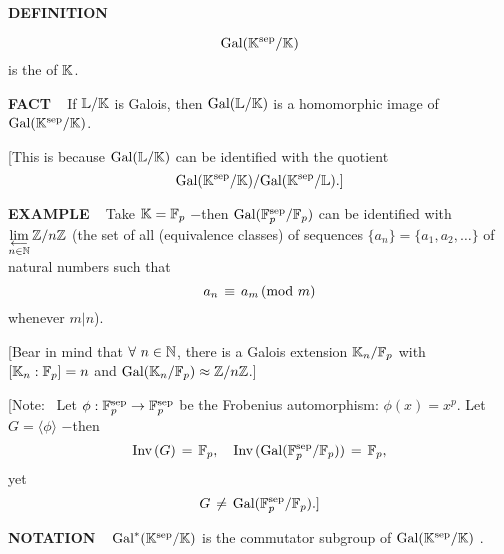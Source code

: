 \begin{x}{\small\bf DEFINITION} \ %

\[
\text{Gal}(\mathbb{K}^{\text{sep}}/\mathbb{K})
\]
is the 
of $\mathbb{K}$.
\end{x}

\vspace{0.1cm}

\begin{x}{\small\bf FACT} \ %
If \hsx $\mathbb{L}/\mathbb{K}$ is Galois, then $\text{Gal}(\mathbb{L}/\mathbb{K})$ is a homomorphic image of $\text{Gal}(\mathbb{K}^{\text{sep}}/\mathbb{K})$.

\vspace{0.1cm}

[This is because $\text{Gal}(\mathbb{L}/\mathbb{K})$ can be identified with the quotient
\[
\text{Gal}(\mathbb{K}^{\text{sep}}/\mathbb{K}) / \text{Gal}(\mathbb{K}^{\text{sep}}/\mathbb{L}).]
\]
\end{x}

\vspace{0.1cm}

\begin{x}{\small\bf EXAMPLE} \ %
Take $\mathbb{K} = \mathbb{F}_p$ $-$then $\text{Gal}(\mathbb{F}_p^{\text{sep}} /\mathbb{F}_p)$ can be identified with \ 
$\lim\limits_{\substack{\longleftarrow\\ n \in \mathbb{N}}} \mathbb{Z}/n\mathbb{Z}$ 
(the set of all (equivalence classes) of sequences $\{a_n\} = \{a_1, a_2, \ldots \}$ 
of natural numbers such that 
\[
a_n \hspace{0.05cm} \equiv \hspace{0.05cm} a_m \hspace{0.05cm} \text{(mod $m$)}
\]
whenever $m|n$).

\vspace{0.1cm}

[Bear in mind that $\forall \ n \in \mathbb{N}$, there is a Galois extension $\mathbb{K}_n/\mathbb{F}_p$ with $[\mathbb{K}_n:\mathbb{F}_p] = n$ and 
$\text{Gal}(\mathbb{K}_n/\mathbb{F}_p) \approx \mathbb{Z}/n\mathbb{Z}$.]

\vspace{0.1cm}

[Note: \ Let $\phi:\mathbb{F}_p^{\text{sep}} \rightarrow \mathbb{F}_p^{\text{sep}}$ be the Frobenius automorphism: $\phi(x) = x^p$.  
Let $G = \langle \phi \rangle$ $-$then 
\[
\text{Inv}\hspace{0.05cm}(G)\hspace{0.05cm} = \hspace{0.05cm} \mathbb{F}_p, \quad  \text{Inv}\hspace{0.05cm}(\text{Gal}(\mathbb{F}_p^{\text{sep}} /\mathbb{F}_p)) \hspace{0.05cm} = \hspace{0.05cm} \mathbb{F}_p,
\]
yet 
\[
G \hspace{0.05cm} \neq \hspace{0.05cm} \text{Gal}(\mathbb{F}_p^{\text{sep}} /\mathbb{F}_p).]
\]
\end{x}

\vspace{0.1cm}


\begin{x}{\small\bf NOTATION} \ %
$\Gal^*(\K^\sep/\K)$ 
\index{$\Gal^*(\K^\sep/\K)$ } 
is the commutator subgroup of $\text{Gal}(\mathbb{K}^{\text{sep}}/\mathbb{K})$ .
\end{x}

